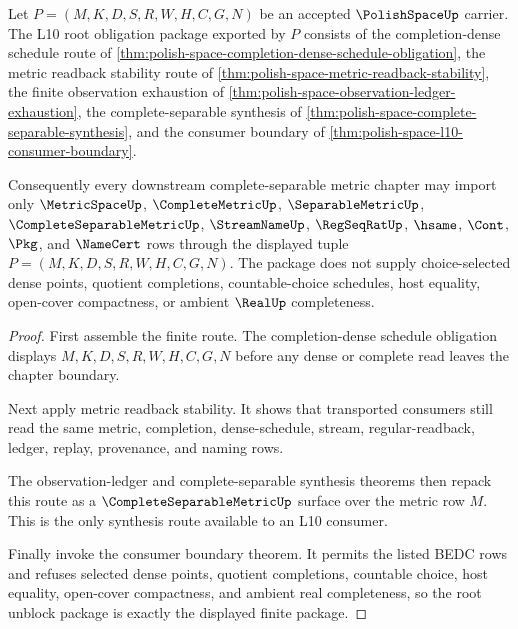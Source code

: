 \begin{theorem}
\label{thm:polish-space-l10-root-unblock-package}
Let $P=(M,K,D,S,R,W,H,C,G,N)$ be an accepted $\PolishSpaceUp$ carrier. The L10 root obligation package exported by $P$ consists of the completion-dense schedule route of \autoref{thm:polish-space-completion-dense-schedule-obligation}, the metric readback stability route of \autoref{thm:polish-space-metric-readback-stability}, the finite observation exhaustion of \autoref{thm:polish-space-observation-ledger-exhaustion}, the complete-separable synthesis of \autoref{thm:polish-space-complete-separable-synthesis}, and the consumer boundary of \autoref{thm:polish-space-l10-consumer-boundary}.

Consequently every downstream complete-separable metric chapter may import only $\MetricSpaceUp$, $\CompleteMetricUp$, $\SeparableMetricUp$, $\CompleteSeparableMetricUp$, $\StreamNameUp$, $\RegSeqRatUp$, $\hsame$, $\Cont$, $\Pkg$, and $\NameCert$ rows through the displayed tuple $P=(M,K,D,S,R,W,H,C,G,N)$. The package does not supply choice-selected dense points, quotient completions, countable-choice schedules, host equality, open-cover compactness, or ambient $\RealUp$ completeness.
\end{theorem}
\begin{proof}
First assemble the finite route. The completion-dense schedule obligation displays $M,K,D,S,R,W,H,C,G,N$ before any dense or complete read leaves the chapter boundary.

Next apply metric readback stability. It shows that transported consumers still read the same metric, completion, dense-schedule, stream, regular-readback, ledger, replay, provenance, and naming rows.

The observation-ledger and complete-separable synthesis theorems then repack this route as a $\CompleteSeparableMetricUp$ surface over the metric row $M$. This is the only synthesis route available to an L10 consumer.

Finally invoke the consumer boundary theorem. It permits the listed BEDC rows and refuses selected dense points, quotient completions, countable choice, host equality, open-cover compactness, and ambient real completeness, so the root unblock package is exactly the displayed finite package.
\end{proof}

